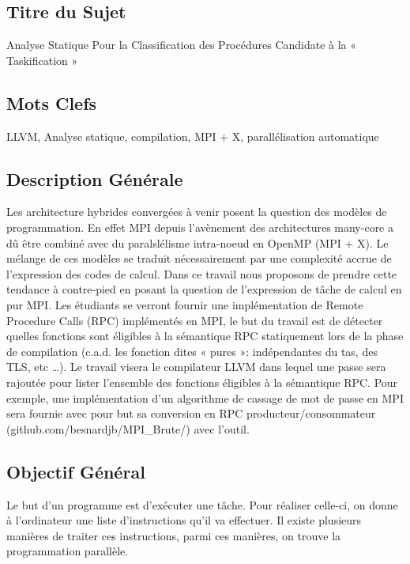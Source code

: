 \documentclass[12pt,titlepage]{article}
\begin{document}
\subsection{Titre du Sujet}

Analyse Statique Pour la Classification des Procédures Candidate à la « Taskification »


\subsection{Mots Clefs}

LLVM, Analyse statique, compilation, MPI + X, parallélisation automatique


\subsection{Description Générale}

Les architecture hybrides convergées à venir posent la question des modèles de programmation. En effet MPI depuis l’avènement des architectures many-core a dû être combiné avec du paralslélisme intra-noeud en OpenMP (MPI + X). Le mélange de ces modèles se traduit nécessairement par une complexité accrue de l’expression des codes de calcul. Dans ce travail nous proposons de prendre cette tendance à contre-pied en posant la question de l’expression de tâche de calcul en pur MPI. Les étudiants se verront fournir une implémentation de Remote Procedure Calls (RPC) implémentés en MPI, le but du travail est de détecter quelles fonctions sont éligibles à la sémantique RPC statiquement lors de la phase de compilation (c.a.d. les fonction dites « pures »: indépendantes du tas, des TLS, etc …). Le travail visera le compilateur LLVM dans lequel une passe sera rajoutée pour lister l’ensemble des fonctions éligibles à la sémantique RPC. Pour exemple, une implémentation d’un algorithme de cassage de mot de passe en MPI sera fournie avec pour but sa conversion en RPC producteur/consommateur (github.com/besnardjb/MPI\_Brute/) avec l’outil.


 \subsection{Objectif Général}

Le but d'un programme est d'exécuter  une tâche. Pour réaliser celle-ci, on donne à l'ordinateur une liste d'instructions qu'il va effectuer. Il existe plusieurs manières de traiter ces instructions, parmi ces manières, on trouve la programmation parallèle.
\end{document}
